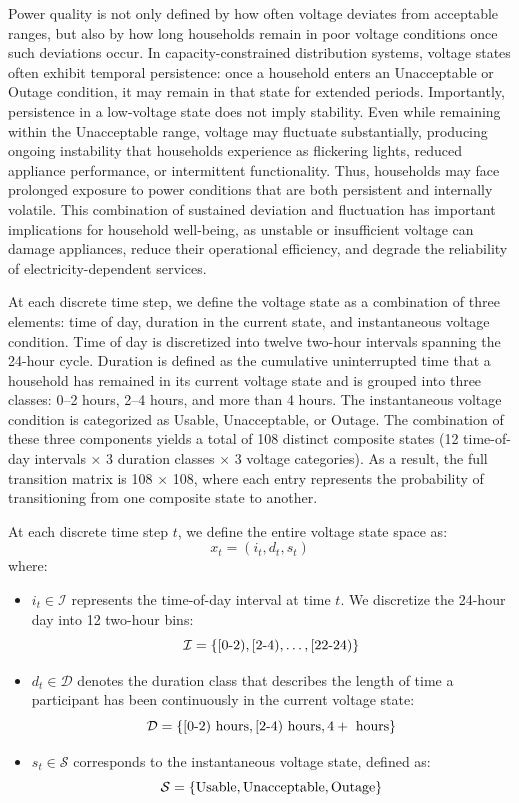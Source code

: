 \documentclass[review]{elsarticle}
\begin{document}
Power quality is not only defined by how often voltage deviates from acceptable ranges, but also by how long households remain in poor voltage conditions once such deviations occur. In capacity-constrained distribution systems, voltage states often exhibit temporal persistence: once a household enters an Unacceptable or Outage condition, it may remain in that state for extended periods. Importantly, persistence in a low-voltage state does not imply stability. Even while remaining within the Unacceptable range, voltage may fluctuate substantially, producing ongoing instability that households experience as flickering lights, reduced appliance performance, or intermittent functionality. Thus, households may face prolonged exposure to power conditions that are both persistent and internally volatile. This combination of sustained deviation and fluctuation has important implications for household well-being, as unstable or insufficient voltage can damage appliances, reduce their operational efficiency, and degrade the reliability of electricity-dependent services.

At each discrete time step, we define the voltage state as a combination of three elements: time of day, duration in the current state, and instantaneous voltage condition. Time of day is discretized into twelve two-hour intervals spanning the 24-hour cycle. Duration is defined as the cumulative uninterrupted time that a household has remained in its current voltage state and is grouped into three classes: 0–2 hours, 2–4 hours, and more than 4 hours. The instantaneous voltage condition is categorized as Usable, Unacceptable, or Outage. The combination of these three components yields a total of 108 distinct composite states (12 time-of-day intervals × 3 duration classes × 3 voltage categories). As a result, the full transition matrix is 108 × 108, where each entry represents the probability of transitioning from one composite state to another.

At each discrete time step \( t \), we define the entire voltage state space as:
\[
x_t = (i_t, d_t, s_t)
\]
where:
\begin{itemize}
    \item \( i_t \in \mathcal{I} \) represents the time-of-day interval at time \( t \). We discretize the 24-hour day into 12 two-hour bins:
    \[
    \mathcal{I} = \{ [0\textnormal{-}2), [2\textnormal{-}4), \ldots, [22\textnormal{-}24) \}
    \]
    \item \( d_t \in \mathcal{D} \) denotes the duration class that describes the length of time a participant has been continuously in the current voltage state:
    \[
    \mathcal{D} = \{ [0\textnormal{-}2) \textnormal{ hours}, [2\textnormal{-}4) \textnormal{ hours}, 4+ \textnormal{ hours} \}
    \]
    \item \( s_t \in \mathcal{S} \) corresponds to the instantaneous voltage state, defined as:
    \[
    \mathcal{S} = \{ \textnormal{Usable}, \textnormal{Unacceptable}, \textnormal{Outage} \}
    \]
\end{itemize}
\end{document}
